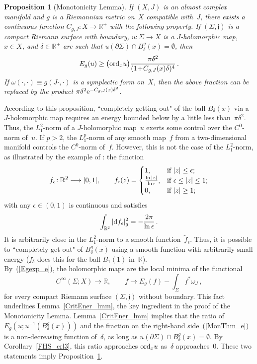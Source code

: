 \documentclass[11pt]{article}
\numberwithin{equation}{section}
\newtheorem{prp}[thm]{Proposition}
\theoremstyle{definition}
\def\BE#1{\begin{equation}\label{#1}}
\def\EE{\end{equation}}
\def\eref#1{(\ref{#1})}
\def\ti#1{\widetilde{#1}}
\def\lra{\longrightarrow}
\def\fj{\mathfrak j}
\def\R{\mathbb R}
\def\de{\delta}
\def\ep{\epsilon}
\def\om{\omega}
\def\Si{\Sigma}
\def\eset{\emptyset}
\def\i{\infty}
\def\prt{\partial}
\def\nd{\textnormal{d}}
\def\ne{\textnormal{e}}
\def\ord{\textnormal{ord}}
\begin{document}
\begin{prp}[Monotonicity Lemma]\label{MonotLmm_prp}
If $(X,J)$ is an almost complex manifold and $g$ is a Riemannian metric on~$X$ compatible with~$J$, 
there exists a continuous function $C_{g,J}\!:X\!\lra\!\R^+$
with the following property.
If $(\Si,\fj)$ is a compact Riemann surface with boundary,
\hbox{$u\!:\Si\!\lra\!X$} is a $J$-holomorphic map, 
$x\!\in\!X$, and $\de\!\in\!\R^+$ are such that 
$u(\prt\Si)\!\cap\!B_{\de}^g(x)\!=\!\eset$, then 
\BE{MonThm_e} E_g(u)\ge \big(\ord_xu\big)\frac{\pi\de^2}{{(1\!+\!C_{g,J}(x)\de)^4}}\,.\EE
If $\om(\cdot,\cdot)\equiv\!g(J\cdot,\cdot)$ is a symplectic form on~$X$, 
then the above fraction can be replaced by the product $\pi\de^2\ne^{-C_{g,J}(x)\de^2}$.
\end{prp}

\noindent
According to this proposition, ``completely getting out" of the ball $B_{\de}(x)$ 
via a $J$-holomorphic map requires an energy bounded below by a little less than~$\pi\de^2$.
Thus, the $L^2_1$-norm of a $J$-holomorphic map~$u$ exerts some control over 
the $C^0$-norm of~$u$. %
If $p\!>\!2$, the $L^p_1$-norm of any smooth map~$f$ from a two-dimensional manifold controls 
the $C^0$-norm of~$f$. 
However, this is not the case of the $L^2_1$-norm, as 
illustrated by the example of \cite[Lemma~10.4.1]{MS12}:
the function
$$f_{\ep}\!:\R^2\lra[0,1], \qquad
f_{\ep}(z)=\begin{cases}1,&\hbox{if}~|z|\le\ep;\\
\frac{\ln|z|}{\ln\ep},&\hbox{if}~\ep\le|z|\le1;\\
0,&\hbox{if}~|z|\ge1;
\end{cases}$$
with any $\ep\!\in\!(0,1)$ is continuous and satisfies
$$\int_{\R^2}|\nd f_{\ep}|_g^2=-\frac{2\pi}{\ln\ep}\,.$$ 
It is arbitrarily close in the $L^2_1$-norm to a smooth function~$\ti{f}_{\ep}$.
Thus, it is possible to ``completely get out" of $B_{\de}^g(x)$   
using a smooth function with arbitrarily small energy
($\ti{f}_{\de}$ does this for the ball $B_1(1)$ in~$\R$).\\

\noindent
By~\eref{Egexp_e}, the holomorphic maps are the local minima of the functional
$$C^{\i}(\Si;X)\lra\R, \qquad f\lra E_g(f)-\int_{\Si}f^*\om_J\,,$$
for every compact Riemann surface $(\Si,\fj)$ without boundary.
This fact underlines  Lemma~\ref{CritEner_lmm},
the key ingredient in the proof of the Monotonicity Lemma.
Lemma~\ref{CritEner_lmm} implies that the ratio of $E_g(u;u^{-1}(B_{\de}^g(x)))$
and the fraction on the right-hand side~\eref{MonThm_e} 
is a non-decreasing function of~$\de$, as long as \hbox{$u(\prt\Si)\!\cap\!B_{\de}^g(x)\!=\!\eset$}.
By Corollary~\ref{FHS_crl3}, this ratio approaches $\ord_xu$ as~$\de$ approaches~0.
These two statements imply Proposition~\ref{MonotLmm_prp}.\\
\end{document}
